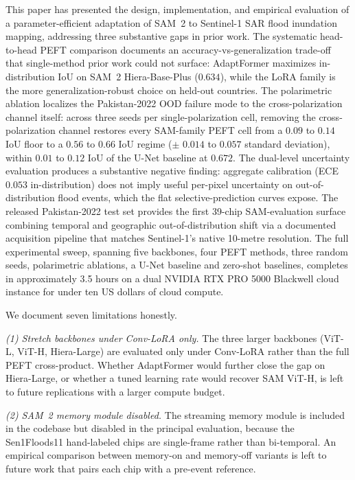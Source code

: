\documentclass[conference]{IEEEtran}
\begin{document}
This paper has presented the design, implementation, and empirical evaluation of a parameter-efficient adaptation of SAM~2 to Sentinel-1 SAR flood inundation mapping, addressing three substantive gaps in prior work. The systematic head-to-head PEFT comparison documents an accuracy-vs-generalization trade-off that single-method prior work could not surface: AdaptFormer maximizes in-distribution IoU on SAM~2 Hiera-Base-Plus ($0.634$), while the LoRA family is the more generalization-robust choice on held-out countries. The polarimetric ablation localizes the Pakistan-2022 OOD failure mode to the cross-polarization channel itself: across three seeds per single-polarization cell, removing the cross-polarization channel restores every SAM-family PEFT cell from a $0.09$ to $0.14$ IoU floor to a $0.56$ to $0.66$ IoU regime ($\pm$ $0.014$ to $0.057$ standard deviation), within $0.01$ to $0.12$ IoU of the U-Net baseline at $0.672$. The dual-level uncertainty evaluation produces a substantive negative finding: aggregate calibration (ECE $0.053$ in-distribution) does not imply useful per-pixel uncertainty on out-of-distribution flood events, which the flat selective-prediction curves expose. The released Pakistan-2022 test set provides the first 39-chip SAM-evaluation surface combining temporal and geographic out-of-distribution shift via a documented acquisition pipeline that matches Sentinel-1's native 10-metre resolution. The full experimental sweep, spanning five backbones, four PEFT methods, three random seeds, polarimetric ablations, a U-Net baseline and zero-shot baselines, completes in approximately 3.5 hours on a dual NVIDIA RTX PRO 5000 Blackwell cloud instance for under ten US dollars of cloud compute.

We document seven limitations honestly.

\textit{(1) Stretch backbones under Conv-LoRA only.} The three larger backbones (ViT-L, ViT-H, Hiera-Large) are evaluated only under Conv-LoRA rather than the full PEFT cross-product. Whether AdaptFormer would further close the gap on Hiera-Large, or whether a tuned learning rate would recover SAM ViT-H, is left to future replications with a larger compute budget.

\textit{(2) SAM~2 memory module disabled.} The streaming memory module is included in the codebase but disabled in the principal evaluation, because the Sen1Floods11 hand-labeled chips are single-frame rather than bi-temporal. An empirical comparison between memory-on and memory-off variants is left to future work that pairs each chip with a pre-event reference.
\end{document}
